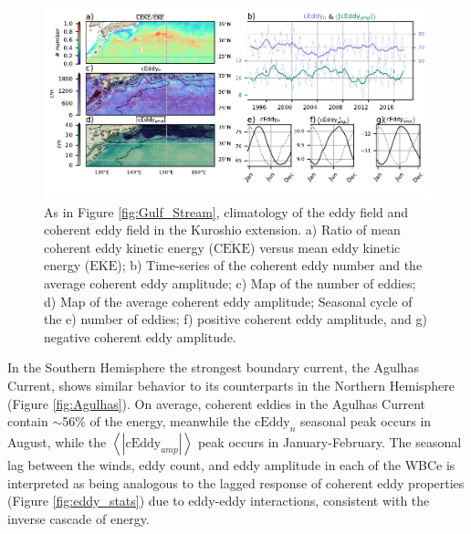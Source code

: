 \documentclass[draft,linenumbers]{agujournal2019}
\newcommand{\MEKE}{\overline{\textrm{EKE}}}
\newcommand{\MCEKE}{\overline{\textrm{CEKE}}}
\newcommand{\cEddy}{\textrm{cEddy}}
\begin{document}
	\begin{figure}
	    \centering
	    \includegraphics[width=1\textwidth]{figures/regional_ratios_and_stats_V3_4.pdf}
	    \caption{As in Figure \ref{fig:Gulf_Stream}, climatology of the eddy field and coherent eddy field in the Kuroshio extension. a) Ratio of mean coherent eddy kinetic energy ($\MCEKE$) versus mean eddy kinetic energy ($\MEKE$); b) Time-series of the coherent eddy number and the average coherent eddy amplitude; c) Map of the number of eddies; d) Map of the average coherent eddy amplitude; Seasonal cycle of the e) number of eddies; f) positive coherent eddy amplitude, and g) negative coherent eddy amplitude.}
	    \label{fig:Kuroshio}
	\end{figure}

	In the Southern Hemisphere the strongest boundary current, the Agulhas Current, shows similar behavior to its counterparts in the Northern Hemisphere (Figure \ref{fig:Agulhas}). On average, coherent eddies in the Agulhas Current contain $\sim$56\% of the energy, meanwhile the $\cEddy_{n}$ seasonal peak occurs in August, while the $\left<|\cEddy_{amp}|\right>$ peak occurs in January-February. 
	The seasonal lag between the winds, eddy count, and eddy amplitude in each of the WBCe is interpreted as being analogous to the lagged response of coherent eddy properties (Figure \ref{fig:eddy_stats}) due to eddy-eddy interactions, consistent with the inverse cascade of energy.
\end{document}
